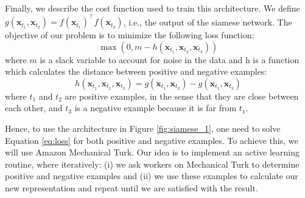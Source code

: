 \documentclass[letterpaper]{article}
\begin{document}
Finally, we describe the cost function used to train this architecture. We define $g(\mathbf{x}_{t_1}, \mathbf{x}_{t_2}) = f(\mathbf{x}_{t_1})^\intercal f(\mathbf{x}_{t_2})$, i.e., the output of the siamese network. The objective of our problem is to minimize the following loss function: 
\begin{equation}
\max (0, m - h(\mathbf{x}_{t_1}, \mathbf{x}_{t_2}, \mathbf{x}_{t_3}) )
\label{eq:loss}
\end{equation}
where $m$ is a slack variable to account for noise in the data and h is a function which calculates the distance between positive and negative examples: 
\begin{equation}
h(\mathbf{x}_{t_1}, \mathbf{x}_{t_2}, \mathbf{x}_{t_3}) = g(\mathbf{x}_{t_1}, \mathbf{x}_{t_2}) - g(\mathbf{x}_{t_1}, \mathbf{x}_{t_3}) 
\end{equation}
where $t_1$ and $t_2$ are positive examples, in the sense that they are close between each other, and $t_3$ is a negative example because it is far from $t_1$. 

Hence, to use the architecture in Figure \ref{fig:siamese_1}, one need to solve Equation \ref{eq:loss} for both positive and negative examples. To achieve this, we will use Amazon Mechanical Turk. Our idea is to implement an active learning routine, where iteratively: (i) we ask workers on Mechanical Turk to determine positive and negative examples and (ii) we use these examples to calculate our new representation and repeat until we are satisfied with the result. 



\end{document}
